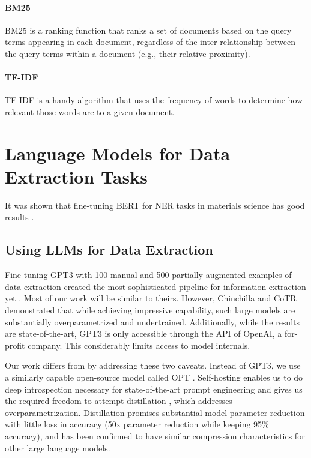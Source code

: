 \paragraph{BM25}

\gls{BM25} is a ranking function that ranks a set of documents based on the query terms appearing in each document, regardless of the inter-relationship between the query terms within a document (e.g., their relative proximity).

\paragraph{TF-IDF}
\gls{TF-IDF} is a handy algorithm that uses the frequency of words to determine how relevant those words are to a given document.

\section{Language Models for Data Extraction Tasks}
It was shown that fine-tuning \gls{BERT} for \gls{NER} tasks in materials science has good results \cite{zhao_finetuning_2021}.

\subsection{Using LLMs for Data Extraction}
Fine-tuning \gls{GPT3} with 100 manual and 500 partially augmented examples of data extraction
created the most sophisticated pipeline for information extraction yet
\cite{dunn_structured_2022}. Most of our work will be similar to theirs. However,
Chinchilla \cite{hoffmann_training_2022} and CoTR \cite{zhang_multimodal_2023}
demonstrated that while achieving impressive capability, such large models are
substantially overparametrized and undertrained. Additionally, while the
results are state-of-the-art, GPT3 is only accessible through the API of
OpenAI, a for-profit company. This considerably limits access to model
internals.

Our work differs from \cite{dunn_structured_2022} by addressing these two
caveats. Instead of GPT3, we use a similarly capable open-source model called
OPT \cite{zhang_opt_2022}. Self-hosting enables us to do deep introspection
necessary for state-of-the-art prompt engineering and gives us the required
freedom to attempt distillation \cite{sun_patient_2019}, which addresses
overparametrization. Distillation promises substantial model parameter
reduction with little loss in accuracy (50x parameter reduction while keeping
95\% accuracy), and has been confirmed to have similar compression characteristics
for other large language models.





